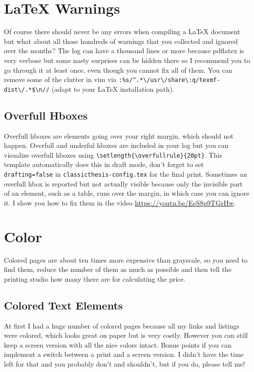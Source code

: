 \section{LaTeX Warnings}
Of course there should never be any errors when compiling a LaTeX document but what about all those hundreds of warnings that you collected and ignored over the months?
The log can have a thousand lines or more because pdflatex is very verbose but some nasty surprises can be hidden there so I recommend you to go through it at least once, even though you cannot fix all of them.
You can remove some of the clutter in vim via \verb+:%s/^.*\/usr\/share\:q/texmf-dist\/.*$\n//+ (adapt to your LaTeX installation path).

\subsection{Overfull Hboxes}
Overfull hboxes are elements going over your right margin, which should not happen.
Overfull and underful hboxes are included in your log but you can visualize overfull hboxes using \verb+\setlength{\overfullrule}{20pt}+.
This template automatically does this in draft mode, don't forget to set \verb+drafting=false+ in \verb+classicthesis-config.tex+ for the final print.
Sometimes an overfull hbox is reported but not actually visible because only the invisible part of an element, such as a table, runs over the margin, in which case you can ignore it.
I show you how to fix them in the video \url{https://youtu.be/EeS8p9TGrHw}.

\section{Color}
Colored pages are about ten times more expensive than grayscale, so you need to find them, reduce the number of them as much as possible and then tell the printing studio how many there are for calculating the price.

\subsection{Colored Text Elements }
At first I had a huge number of colored pages because all my links and listings were colored, which looks great on paper but is very costly.
However you can still keep a screen version with all the nice colors intact.
Bonus points if you can implement a switch between a print and a screen version.
I didn't have the time left for that and you probably don't and shouldn't, but if you do, please tell me!

